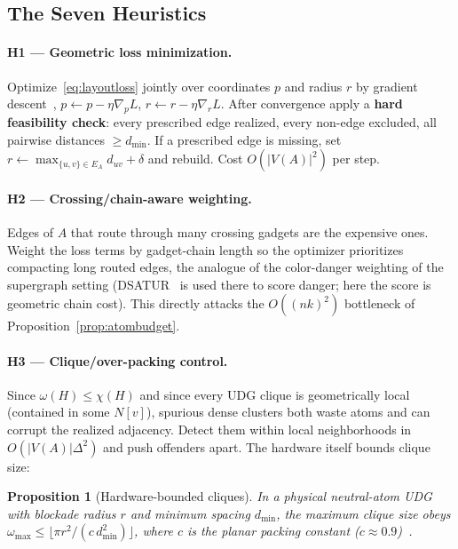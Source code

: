 \documentclass[11pt]{article}
\newtheorem{proposition}[theorem]{Proposition}
\theoremstyle{definition}
\theoremstyle{remark}
\begin{document}
\subsection{The Seven Heuristics}
\label{sec:seven}

\paragraph{H1 --- Geometric loss minimization.} Optimize~\eqref{eq:layoutloss}
jointly over coordinates $p$ and radius $r$ by gradient
descent~\cite{Nesterov2004,Boyd2004}, $p\leftarrow p-\eta\nabla_p L$,
$r\leftarrow r-\eta\nabla_r L$. After convergence apply a \textbf{hard feasibility
check}: every prescribed edge realized, every non-edge excluded, all pairwise
distances $\ge d_{\min}$. If a prescribed edge is missing, set
$r\leftarrow\max_{\{u,v\}\in E_A}d_{uv}+\delta$ and rebuild. Cost
$O(|V(A)|^2)$ per step.

\paragraph{H2 --- Crossing/chain-aware weighting.} Edges of $A$ that route through
many crossing gadgets are the expensive ones. Weight the loss terms by gadget-chain
length so the optimizer prioritizes compacting long routed edges, the analogue of
the color-danger weighting of the supergraph setting (DSATUR~\cite{Brelaz1979} is
used there to score danger; here the score is geometric chain cost). This directly
attacks the $O((nk)^2)$ bottleneck of Proposition~\ref{prop:atombudget}.

\paragraph{H3 --- Clique/over-packing control.} Since $\omega(H)\le\chi(H)$ and
since every UDG clique is geometrically local (contained in some $N[v]$), spurious
dense clusters both waste atoms and can corrupt the realized adjacency. Detect them
within local neighborhoods in $O(|V(A)|\Delta^2)$ and push offenders apart. The
hardware itself bounds clique size:

\begin{proposition}[Hardware-bounded cliques]
\label{prop:hwclique}
In a physical neutral-atom UDG with blockade radius $r$ and minimum spacing
$d_{\min}$, the maximum clique size obeys
$\omega_{\max}\le\bigl\lfloor \pi r^2 / (c\,d_{\min}^2)\bigr\rfloor$, where $c$ is
the planar packing constant ($c\approx 0.9$)~\cite{Heppes2003}.
\end{proposition}
\end{document}
